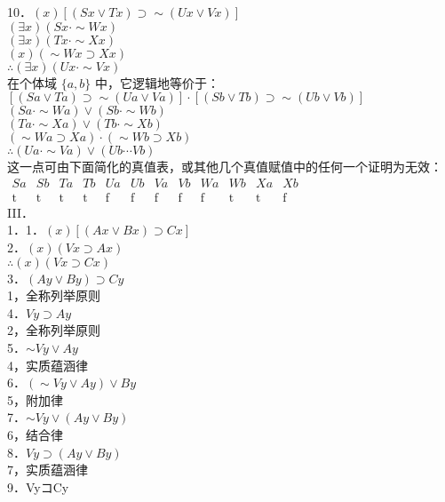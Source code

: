 10．$(x)[(S x \vee T x) \supset \sim(U x \vee V x)]$\\
$(\exists x)(S x \cdot \sim W x)$\\
$(\exists x)(T x \cdot \sim X x)$\\
$(x)(\sim W x \supset X x)$\\
$\therefore(\exists x)(U x \cdot \sim V x)$\\
在个体域 $\{a, b\}$ 中，它逻辑地等价于：\\
$[(S a \vee T a) \supset \sim(U a \vee V a)] \cdot[(S b \vee T b) \supset \sim(U b \vee V b)]$\\
$(S a \cdot \sim W a) \vee(S b \cdot \sim W b)$\\
$(T a \cdot \sim X a) \vee(T b \cdot \sim X b)$\\
$(\sim W a \supset X a) \cdot(\sim W b \supset X b)$\\
$\therefore(U a \cdot \sim V a) \vee(U b \cdots V b)$\\
这一点可由下面简化的真值表，或其他几个真值赋值中的任何一个证明为无效：\\
$\begin{array}{ccccccccccccc}S a & S b & T a & T b & U a & U b & V a & V b & W a & W b & X a & X b \\ \mathrm{t} & \mathrm{t} & \mathrm{t} & \mathrm{t} & \mathrm{f} & \mathrm{f} & \mathrm{f} & \mathrm{f} & \mathrm{f} & \mathrm{t} & \mathrm{t} & \mathrm{f}\end{array}$\\
III．\\
1．1．$(x)[(A x \vee B x) \supset C x]$\\
2．$(x)(V x \supset A x)$\\
$\therefore(x)(V x \supset C x)$\\
3．$(A y \vee B y) \supset C y$\\
1，全称列举原则\\
4．$V y \supset A y$\\
2，全称列举原则\\
5．$\sim V y \vee A y$\\
4，实质蕴涵律\\
6．$(\sim V y \vee A y) \vee B y$\\
5，附加律\\
7．$\sim V y \vee(A y \vee B y)$\\
6，结合律\\
8．$V y \supset(A y \vee B y)$\\
7，实质蕴涵律\\
9．VyコCy\\
